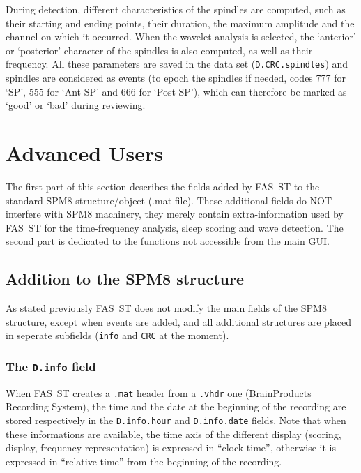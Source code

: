 \documentclass[a4paper,titlepage]{article}
\def\dblS{\hbox{S\hskip -4.5pt S}}
\newcommand{\fasst}{FA\dblS T } 	%
\begin{document}
During detection, different characteristics of the spindles are computed, such as their starting and ending points, their duration, the maximum amplitude and the channel on which it occurred. When the wavelet analysis is selected, the `anterior' or `posterior' character of the spindles is also computed, as well as their frequency. All these parameters are saved in the data set ({\tt D.CRC.spindles}) and spindles are considered as events (to epoch the spindles if needed, codes 777 for `SP', 555 for `Ant-SP' and 666 for `Post-SP'), which can therefore be marked as `good' or `bad' during reviewing.

\section{Advanced Users}
\label{sec:advus}
The first part of this section describes the fields added by \fasst to the standard SPM8 structure/object (.mat file). These additional fields do NOT interfere with SPM8 machinery, they merely contain extra-information used by \fasst for the time-frequency analysis, sleep scoring and wave detection. The second part is dedicated to the functions not accessible from the main GUI.

\subsection{Addition to the SPM8 structure}
As stated previously \fasst does not modify the main fields of the SPM8 structure, except when events are added, and all additional structures are placed in seperate subfields ({\tt info} and {\tt CRC} at the moment). %

\subsubsection{The {\tt D.info} field}
When \fasst creates a {\tt .mat} header from a {\tt .vhdr} one (BrainProducts Recording System), the time and the date at the beginning of the recording are stored respectively in the {\tt D.info.hour} and {\tt D.info.date} fields. Note that when these informations are available, the time axis of the different display (scoring, display, frequency representation) is expressed in ``clock time'', otherwise it is expressed in ``relative time'' from the beginning of the recording.
\end{document}
